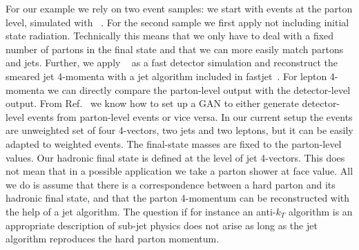 For our example we rely on two event samples: we start with events at
the parton level, simulated with \madgraph~\cite{madgraph}. For
the second sample we first apply \pythia not including initial state radiation. Technically this
means that we only have to deal with a fixed number of partons in the
final state and that we can more easily match partons and jets. Further, we apply \delphes~\cite{delphes} as a fast detector
simulation and reconstruct the smeared jet 4-momenta with a jet
algorithm included in fastjet~\cite{FastJet}. For lepton 4-momenta we can directly compare the
parton-level output with the detector-level output. From
Ref.~\cite{gan_phasespace} we know how to set up a GAN to either
generate detector-level events from parton-level events or vice
versa. In our current setup the events are unweighted set of four
4-vectors, two jets and two leptons, but it can be easily adapted to
weighted events. The final-state masses are fixed to the parton-level
values. Our hadronic final state is defined at the level of jet
4-vectors. This does not mean that in a possible application we take a
parton shower at face value. All we do is assume that there is a
correspondence between a hard parton and its hadronic final state, and
that the parton 4-momentum can be reconstructed with the help of a jet
algorithm. The question if for instance an anti-$k_T$ algorithm is an
appropriate description of sub-jet physics does not arise as long as
the jet algorithm reproduces the hard parton momentum.


